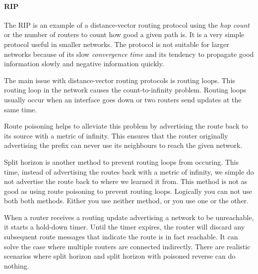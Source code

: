 \paragraph{\acf{RIP}}
The \acl{RIP} is an example of a distance-vector routing protocol using the \emph{hop count} or the number of routers to count how good a given path is.%
It is a very simple protocol useful in smaller networks.
The protocol is not suitable for larger networks because of its slow \emph{convergence time} and its tendency to propagate good information slowly and negative information quickly.

The main issue with distance-vector routing protocols is routing loops.%
This routing loop in the network causes the count-to-infinity problem.%
Routing loops usually occur when an interface goes down or two routers send updates at the same time.

Route poisoning helps to alleviate this problem by advertising the route back to its source with a metric of infinity.
This ensures that the router originally advertising the prefix can never use its neighbours to reach the given network.

Split horizon is another method to prevent routing loops from occuring.%
This time, instead of advertising the routes back with a metric of infinity, we simple do not advertise the route back to where we learned it from.
This method is not as good as using route poisoning to prevent routing loops.
Logically you can not use both both methods. Either you use neither method, or you use one or the other.

When a router receives a routing update advertising a network to be unreachable, it starts a hold-down timer.
Until the timer expires, the router will discard any subsequent route messages that indicate the route is in fact reachable.
It can solve the case where multiple routers are connected indirectly.
There are realistic scenarios where split horizon and split horizon with poisoned reverse can do nothing.%

